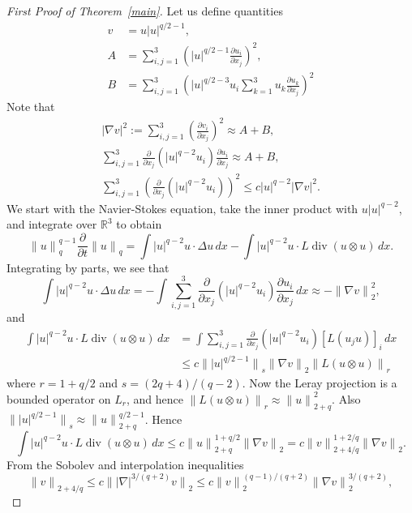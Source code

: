 \documentclass[12pt]{amsart}
\theoremstyle{remark}
\newcommand{\R}{{\mathbb R}}
\newcommand{\smodo}[1]{{\mathopen|#1\mathclose|}}
\newcommand{\snormo}[1]{{\mathopen\|#1\mathclose\|}}
\DeclareMathOperator{\divergence}{div}
\begin{document}
\begin{proof}[First Proof of Theorem~\ref{main}]
Let us define quantities
\begin{align*}
v &= u \smodo u^{q/2-1} ,\\
A &= \sum_{i,j=1}^3 \left(\smodo u^{q/2-1} 
     \frac{\partial u_i}{\partial x_j} \right)^2 ,\\
B &= \sum_{i,j=1}^3 \left(\smodo u^{q/2-3} u_i \sum_{k=1}^3 u_k 
     \frac{\partial u_k}{\partial x_j}\right)^2
\end{align*}
Note that
\begin{gather*}
   \smodo{\nabla v}^2 := \sum_{i,j=1}^3 \left(
   \frac{\partial v_i}{\partial x_j}\right)^2
   \approx A + B,\\
   \sum_{i,j=1}^3 \frac\partial{\partial x_j}\left( \smodo u^{q-2} u_i \right)
   \frac{\partial u_i}{\partial x_j}
   \approx A + B,\\
   \sum_{i,j=1}^3 \left(\frac\partial{\partial x_j} 
   \left(\smodo u^{q-2} u_i\right)\right)^2
   \le
   c \smodo u^{q-2} \smodo{\nabla v}^2 .
\end{gather*}
We start with the Navier-Stokes equation, take the inner product with 
$u \smodo{u}^{q-2}$, and integrate over $\R^3$ to obtain
$$
    \snormo u_q^{q-1} \frac{\partial}{\partial t} \snormo u_q
    =
    \int \smodo u^{q-2} u \cdot \Delta u \, dx
    -
    \int \smodo u^{q-2} u \cdot L \divergence (u \otimes u) \, dx .
$$
Integrating by parts, we see that
$$ \int \smodo u^{q-2} u \cdot \Delta u \, dx
   =
   - \int 
   \sum_{i,j=1}^3 \frac\partial{\partial x_j}\left( \smodo u^{q-2} u_i \right)
   \frac{\partial u_i}{\partial x_j}
   \, dx
   \approx
   - \snormo{\nabla v}_2^2 ,$$
and
\begin{align*} 
   \int \smodo u^{q-2} u \cdot L \divergence (u \otimes u) \, dx
   &=
   \int \sum_{i,j=1}^3
        \frac\partial{\partial x_j} \left(\smodo u^{q-2} u_i\right)
        [L (u_j u)]_i \, dx \\
   &\le
   c \snormo{\smodo{u}^{q/2-1}}_s \snormo{\nabla v}_2 \snormo{L(u \otimes u)}_r
\end{align*}
where $r = 1+q/2$ and $s = (2q+4)/(q-2)$.  Now the Leray projection is a bounded
operator on $L_r$, and hence 
$\snormo{L(u \otimes u)}_r \approx \snormo u_{2+q}^2$.  Also
$\snormo{\smodo{u}^{q/2-1}}_s \approx \snormo u_{2+q}^{q/2-1}$.  Hence
$$ \int \smodo u^{q-2} u \cdot L \divergence (u \otimes u) \, dx
   \le c \snormo u_{2+q}^{1+q/2} \snormo{\nabla v}_2 
   = c \snormo v_{2+4/q}^{1+2/q} \snormo{\nabla v}_2 .$$
From the Sobolev and interpolation inequalities
$$ \snormo v_{2+4/q} \le c \snormo{ \smodo{\nabla}^{3/(q+2)} v}_2
   \le c \snormo v_2^{(q-1)/(q+2)} \snormo{\nabla v}_2^{3/(q+2)} ,$$

\end{proof}
\end{document}
